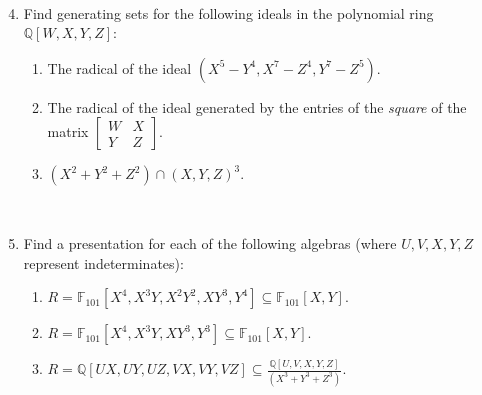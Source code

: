 \documentclass[12pt]{amsart}
\newcommand{\Q}{\mathbb{Q}}
\newcommand{\F}{\mathbb{F}}
\begin{document}
\

\begin{enumerate}\setcounter{enumi}{3}


\item Find generating sets for the following ideals in the polynomial ring $\Q[W,X,Y,Z]$:
\begin{enumerate}
\item The radical of the ideal $(X^5-Y^4,X^7-Z^4,Y^7-Z^5)$.
\item The radical of the ideal generated by the entries of the \emph{square} of the matrix $\begin{bmatrix} W & X \\ Y& Z\end{bmatrix}$.
\item $(X^2+Y^2+Z^2) \cap (X,Y,Z)^3$.
\end{enumerate}

\

\item Find a presentation for each of the following algebras (where $U,V,X,Y,Z$ represent indeterminates):
\begin{enumerate}
\item $R=\F_{101}[X^4,X^3Y,X^2Y^2,XY^3,Y^4]\subseteq \F_{101}[X,Y]$.
\item  $R=\F_{101}[X^4,X^3Y,XY^3,Y^3]\subseteq \F_{101}[X,Y]$.
\item  $\displaystyle R=\Q[UX,UY,UZ,VX,VY,VZ]\subseteq \frac{\Q[U,V,X,Y,Z]}{(X^3+Y^3+Z^3)}$.
\end{enumerate}

\



\end{enumerate}
\end{document}
